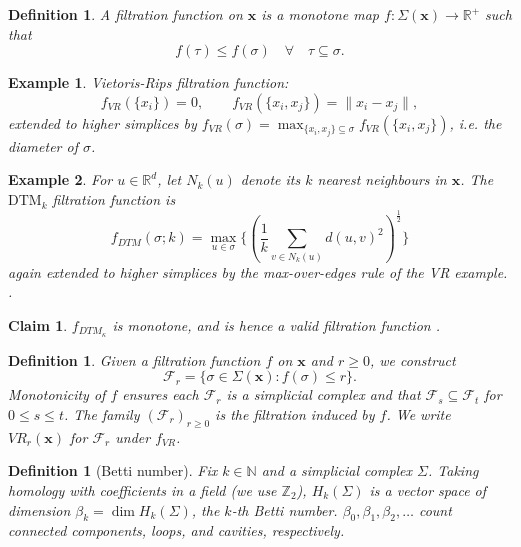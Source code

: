 \documentclass[11pt,letterpaper]{article}
\newcommand{\R}{\mathbb{R}}
\newcommand{\N}{\mathbb{N}}
\newcommand{\Z}{\mathbb{Z}}
\newcommand{\1}{\mathds{1}}
\newcommand{\pc}{\mathbf{x}}
\newcommand{\simpcom}{\Sigma}
\theoremstyle{plain}
\newtheorem{claim}[theorem]{Claim}
\theoremstyle{definitioncolon}
\newtheorem{definition}[theorem]{Definition}
\newtheorem*{example}{Example}
\begin{document}
    \begin{definition}
        A filtration function on $\pc$ is a monotone map
        $f: \Sigma(\pc) \rightarrow \R^+$ such that
            \[
            f(\tau) \leq f(\sigma) \quad \forall \quad \tau \subseteq \sigma.
            \]
    \end{definition}

    \begin{example}
        Vietoris-Rips filtration function:
            \[
            f_{VR}(\{x_i\}) = 0, \qquad f_{VR}(\{x_i, x_j\}) = \|x_i - x_j\|,
            \]
        extended to higher simplices by $f_{VR}(\sigma) = \max_{\{x_i,x_j\}
        \subseteq \sigma} f_{VR}(\{x_i, x_j\})$, i.e. the diameter of $\sigma$.
    \end{example}

    \begin{example}
    \label{ex:dtm}
        For $u \in \R^d$, let $N_k(u)$ denote its $k$ nearest neighbours in
        $\pc$. The $\mathrm{DTM}_k$ filtration function is
            \[
            f_{DTM}(\sigma; k) = \max_{u \in \sigma}\{(\frac{1}{k}
            \sum_{v \in N_k(u)} d(u, v)^2)^{\frac{1}{2}}\}
            \]
        again extended to higher simplices by the max-over-edges rule of the VR
        example. \citep{anai2020dtm}.
    \end{example}

    \begin{claim}
        $f_{DTM_\kappa}$ is monotone, and is hence a valid filtration function
        \citep[Prop.\ 3.5]{anai2020dtm}.
    \end{claim}

    \begin{definition}
        Given a filtration function $f$ on $\pc$ and $r \geq 0$, we construct
            \[
            \mathcal{F}_r = \{\sigma \in \Sigma(\pc) : f(\sigma)
            \leq r\}.
            \]
        Monotonicity of $f$ ensures each $\mathcal{F}_r$ is a simplicial complex
        and that $\mathcal{F}_s \subseteq \mathcal{F}_t$ for $0 \leq s \leq t$.
        The family $(\mathcal{F}_r)_{r \geq 0}$ is the \emph{filtration} induced
        by $f$. We write $VR_r(\pc)$ for $\mathcal{F}_r$ under $f_{VR}$.
    \end{definition}

    \begin{definition}[Betti number]
        Fix $k \in \N$ and a simplicial complex $\Sigma$. Taking homology
        with coefficients in a field (we use $\Z_2$), $H_k(\simpcom)$ is a
        vector space of dimension $\beta_k = \dim H_k(\simpcom)$, the $k$-th
        \emph{Betti number}. $\beta_0, \beta_1, \beta_2, \dots$ count connected
        components, loops, and cavities, respectively.
    \end{definition}
\end{document}
